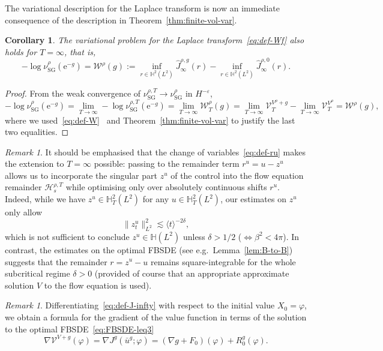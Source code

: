 \documentclass[11pt, a4paper]{scrartcl}
\numberwithin{equation}{section}
\theoremstyle{plain}
\newtheorem{corollary}[foo]{Corollary}
\theoremstyle{remark}
\newtheorem{remark}[foo]{Remark}
\newcommand{\assign}{:=}
\newcommand{\mathe}{\mathrm{e}}
\newcommand{\tmop}[1]{\ensuremath{\operatorname{#1}}}
\begin{document}
The variational description for the Laplace transform is now an immediate
consequence of the description in Theorem~\ref{thm:finite-vol-var}.

\begin{corollary}
	The variational problem for the Laplace transform~\eqref{eq:def-Wf} also
	holds for $T = \infty$, that is,
	\[ - \log \nu_{\tmop{SG}}^{\rho} (\mathe^{- g}) = \mathcal{W}^{\rho} (g)
		\assign \inf_{r \in \mathbb{H}^2 (L^2)}  \hat{J}_{\infty}^{\rho, g} (r) -
		\inf_{r \in \mathbb{H}^2 (L^2)}  \hat{J}_{\infty}^{\rho, 0} (r) . \]
\end{corollary}

\begin{proof}
	From the weak convergence of $\nu_{\tmop{SG}}^{\rho, T} \rightarrow
		\nu_{\tmop{SG}}^{\rho}$ in $H^{- \varepsilon}$,
	{\small{\[ - \log \nu_{\tmop{SG}}^{\rho} (\mathe^{- g}) = \lim_{T \rightarrow
						\infty} - \log \nu_{\tmop{SG}}^{\rho, T} (\mathe^{- g}) = \lim_{T
						\rightarrow \infty}  \mathcal{W}_T^{\rho} (g) = \lim_{T \rightarrow
						\infty}  \mathcal{V}_T^{V^{\rho} + g} - \lim_{T \rightarrow \infty}
					\mathcal{V}_T^{V^{\rho}} = \mathcal{W}^{\rho} (g) , \]}}
	where we used~\eqref{eq:def-W} \ and Theorem~\ref{thm:finite-vol-var} to
	justify the last two equalities.
\end{proof}

\begin{remark}
	It should be emphasised that the change of variables~\eqref{eq:def-ru} makes
	the extension to $T = \infty$ possible: passing to the remainder term $r^u =
		u - z^u$ allows us to incorporate the singular part $z^u$ of the control
	into the flow equation remainder $\mathcal{H}^{\rho, T}_s$ while optimising
	only over absolutely continuous shifts $r^u$. Indeed, while we have $z^u \in
		\mathbb{H}_T^2 (L^2)$ for any $u \in \mathbb{H}_T^2 (L^2)$, our estimates on
	$z^u$ only allow
	\[ \| z^u_t \|_{L^2}^2 \lesssim \langle t \rangle^{- 2 \delta}, \]
	which is not sufficient to conclude $z^u \in \mathbb{H} (L^2)$ unless
	$\delta > 1 / 2$ ($\Leftrightarrow \beta^2 < 4 \pi$). In contrast, the
	estimates on the optimal FBSDE (see e.g.~Lemma~\ref{lem:B-to-B}) suggests
	that the remainder $r=z^u-u$ remains square-integrable for the whole
	subcritical regime $\delta > 0$ (provided of course that an appropriate
	approximate solution $V$ to the flow equation is used).
\end{remark}

\begin{remark}
	\label{rem:gradJ=R}Differentiating~\eqref{eq:def-J-infty} with respect to
	the initial value $X_0 = \varphi$, we obtain a formula for the gradient of
	the value function in terms of the solution to the optimal
	FBSDE~\eqref{eq:FBSDE-leq3}
	\begin{equation}
		\nabla \mathcal{V}^{V + g} (\varphi) = \nabla J^g (\bar{u}^g ; \varphi) =
		(\nabla g + F_0) (\varphi) + R^g_0 (\varphi) . \label{eq:gradV=F+R}
	\end{equation}
\end{remark}
\end{document}
